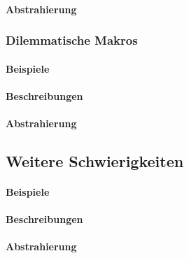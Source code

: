 \paragraph*{Abstrahierung}

\subsubsection{Dilemmatische Makros}\label{problems:macrodilemma}
\paragraph*{Beispiele}
\paragraph*{Beschreibungen}
\paragraph*{Abstrahierung}

\subsection{Weitere Schwierigkeiten}\label{problems:additional}
\paragraph*{Beispiele}
\paragraph*{Beschreibungen}
\paragraph*{Abstrahierung}

